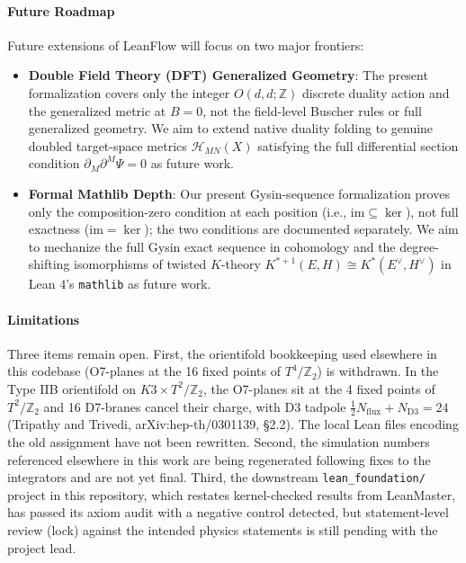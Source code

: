 \documentclass[11pt,a4paper]{article}
\begin{document}
\paragraph{Future Roadmap}
Future extensions of LeanFlow will focus on two major frontiers:
\begin{itemize}
    \item \textbf{Double Field Theory (DFT) Generalized Geometry}: The present formalization covers only the integer $O(d,d;\mathbb{Z})$ discrete duality action and the generalized metric at $B=0$, not the field-level Buscher rules or full generalized geometry. We aim to extend native duality folding to genuine doubled target-space metrics $\mathcal{H}_{MN}(X)$ satisfying the full differential section condition $\partial_M \partial^M \Psi = 0$ as future work.
    \item \textbf{Formal Mathlib Depth}: Our present Gysin-sequence formalization proves only the composition-zero condition at each position (i.e., $\mathrm{im} \subseteq \ker$), not full exactness ($\mathrm{im} = \ker$); the two conditions are documented separately. We aim to mechanize the full Gysin exact sequence in cohomology and the degree-shifting isomorphisms of twisted $K$-theory $K^{*+1}(E, H) \cong K^*(E^\vee, H^\vee)$ in Lean 4's \texttt{mathlib} as future work.
\end{itemize}

\paragraph{Limitations}
Three items remain open. First, the orientifold bookkeeping used elsewhere in this codebase (O7-planes at the 16 fixed points of $T^4/\mathbb{Z}_2$) is withdrawn. In the Type IIB orientifold on $K3\times T^2/\mathbb{Z}_2$, the O7-planes sit at the 4 fixed points of $T^2/\mathbb{Z}_2$ and 16 D7-branes cancel their charge, with D3 tadpole $\tfrac12 N_{\text{flux}} + N_{\text{D3}} = 24$ (Tripathy and Trivedi, arXiv:hep-th/0301139, \S2.2). The local Lean files encoding the old assignment have not been rewritten. Second, the simulation numbers referenced elsewhere in this work are being regenerated following fixes to the integrators and are not yet final. Third, the downstream \texttt{lean\_foundation/} project in this repository, which restates kernel-checked results from LeanMaster, has passed its axiom audit with a negative control detected, but statement-level review (lock) against the intended physics statements is still pending with the project lead.
\end{document}
